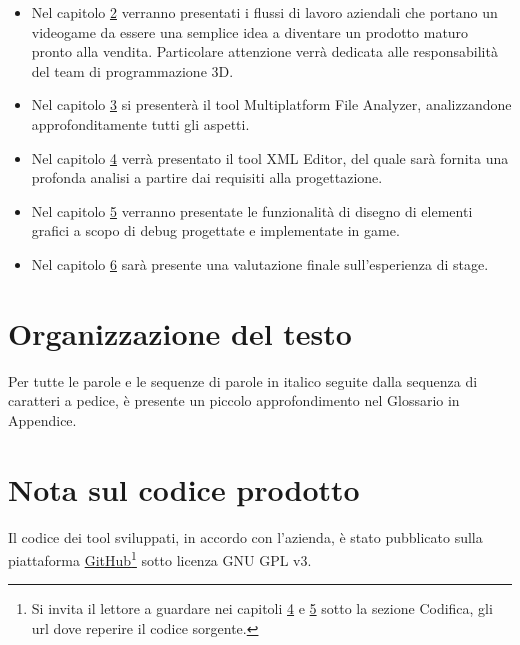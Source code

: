 \begin{itemize}
	\item Nel capitolo \hyperref[cap:milestone]{2} verranno presentati i flussi di lavoro aziendali che portano un videogame da essere una semplice idea a diventare un prodotto maturo pronto alla vendita. Particolare attenzione verrà dedicata alle responsabilità del team di programmazione 3D.
	
	
	\item Nel capitolo \hyperref[cap:multiplatform-file-analyzer]{3} si presenterà il tool Multiplatform File Analyzer, analizzandone approfonditamente tutti gli aspetti.
	
	\item Nel capitolo \hyperref[cap:xml-editor]{4} verrà presentato il tool XML Editor, del quale sarà fornita una profonda analisi a partire dai requisiti alla progettazione.
	
	\item Nel capitolo \hyperref[cap:game]{5} verranno presentate le funzionalità di disegno di elementi grafici a scopo di debug progettate e implementate in game.
	
	\item Nel capitolo \hyperref[cap:conclusioni]{6} sarà presente una valutazione finale sull'esperienza di stage.
\end{itemize}

\section{Organizzazione del testo}

Per tutte le parole e le sequenze di parole in italico seguite dalla sequenza di caratteri  a pedice, è presente un piccolo approfondimento nel Glossario in Appendice.

\section{Nota sul codice prodotto}

Il codice dei tool sviluppati, in accordo con l'azienda, è stato pubblicato sulla piattaforma \hyperref{https://github.com/}{}{}{GitHub\textsuperscript{\textregistered}}\footnote{Si invita il lettore a guardare nei capitoli \hyperref[cap:multiplatform-file-analyzer]{4} e \hyperref[cap:xml-editor]{5} sotto la sezione Codifica, gli url dove reperire il codice sorgente.} sotto licenza GNU GPL v3.\\

